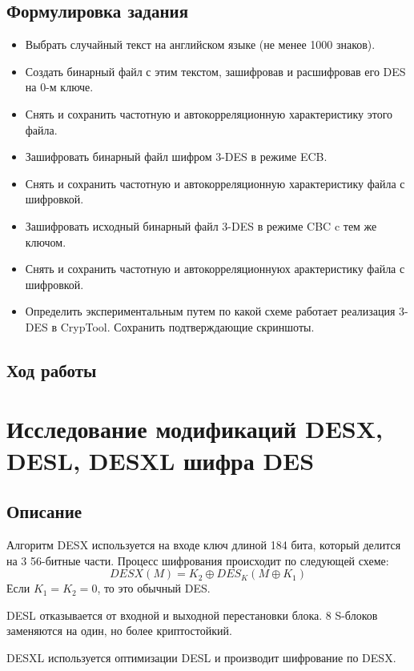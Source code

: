 \documentclass[a4paper, 14pt]{extarticle}
\begin{document}
\subsection{Формулировка задания}
\begin{itemize}
    \item Выбрать случайный текст на английском языке (не менее 1000 знаков).
    \item Создать бинарный файл с этим текстом, зашифровав и расшифровав его DES на 0-м ключе.
    \item Снять и сохранить частотную и автокорреляционную характеристику этого файла. 
    \item Зашифровать бинарный файл шифром 3-DES в режиме ECB.\@
    \item Снять и сохранить частотную и автокорреляционную характеристику файла с шифровкой.
    \item Зашифровать исходный бинарный файл 3-DES в режиме CBC c тем же ключом.
    \item Снять и сохранить частотную и автокорреляционнуюх арактеристику файла с шифровкой.
    \item Определить экспериментальным путем по какой схеме работает
        реализация 3-DES в CrypTool. Сохранить подтверждающие скриншоты.
\end{itemize}

\subsection{Ход работы}
\lipsum[1] %

\section{Исследование модификаций DESX, DESL, DESXL шифра DES}
\subsection{Описание}
Алгоритм DESX используется на входе ключ длиной 184 бита, который делится на 3 56-битные части. Процесс шифрования происходит по следующей схеме:
\[ DESX(M) = K_2 \oplus DES_K (M \oplus K_1) \]
Если $K_1 = K_2 = 0$, то это обычный DES.\@

DESL отказывается от входной и выходной перестановки блока. 8 S-блоков заменяются на один, но более криптостойкий.

DESXL используется оптимизации DESL и производит шифрование по DESX.\@
\end{document}
